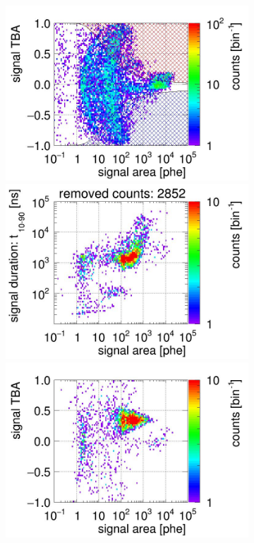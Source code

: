 \begin{landscape}
\begin{figure}[!p]
\begin{subfigure}[t]{0.33\textwidth}
			\includegraphics[width=\figurewidth,clip,trim={0 98 0 40}]{Figures/GasTest/CutsValid/res64765/tbapa26Vecfig64765.jpg}
			\includegraphics[width=\figurewidth,clip,trim={0 98 0 10}]{Figures/GasTest/CutsValid/res64765/pdpaX26Vecfig64765.jpg}
			\includegraphics[width=\figurewidth,clip,trim={0 0 0 40}]{Figures/GasTest/CutsValid/res64765/tbapaX26Vecfig64765.jpg}

\end{subfigure}
\end{figure}
\end{landscape}
